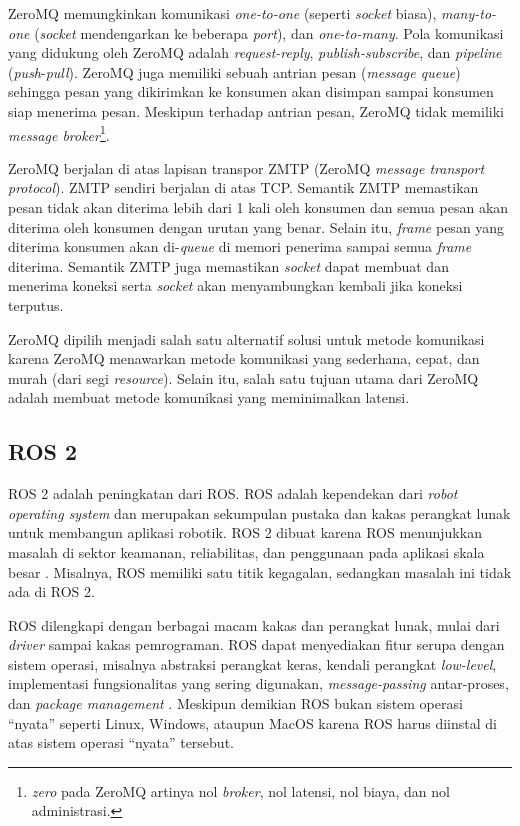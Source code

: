 ZeroMQ memungkinkan komunikasi \textit{one-to-one} (seperti \textit{socket}
biasa), \textit{many-to-one} (\textit{socket} mendengarkan ke beberapa
\textit{port}), dan \textit{one-to-many}. Pola komunikasi yang didukung oleh
ZeroMQ adalah \textit{request-reply}, \textit{publish-subscribe}, dan
\textit{pipeline} (\textit{push}-\textit{pull}). ZeroMQ juga memiliki sebuah
antrian pesan (\textit{message queue}) sehingga pesan yang dikirimkan ke
konsumen akan disimpan sampai konsumen siap menerima pesan. Meskipun terhadap
antrian pesan, ZeroMQ tidak memiliki \textit{message
	broker}\footnote{\textit{zero} pada ZeroMQ artinya nol \textit{broker}, nol
	latensi, nol biaya, dan nol administrasi.}.

ZeroMQ berjalan di atas lapisan transpor ZMTP (ZeroMQ \textit{message transport
	protocol}). ZMTP sendiri berjalan di atas TCP. Semantik ZMTP memastikan
pesan tidak akan diterima lebih dari 1 kali oleh konsumen dan semua pesan
akan diterima oleh konsumen dengan urutan yang benar. Selain itu,
\textit{frame} pesan yang diterima konsumen akan di-\textit{queue} di memori
penerima sampai semua \textit{frame} diterima. Semantik ZMTP juga memastikan
\textit{socket} dapat membuat dan menerima koneksi serta \textit{socket}
akan menyambungkan kembali jika koneksi terputus.

ZeroMQ dipilih menjadi salah satu alternatif solusi untuk metode komunikasi
karena ZeroMQ menawarkan metode komunikasi yang sederhana, cepat, dan murah
(dari segi \textit{resource}). Selain itu, salah satu tujuan utama dari ZeroMQ
adalah membuat metode komunikasi yang meminimalkan latensi.

\subsection{ROS 2}\label{chapter-2-section-ros2}

ROS 2 adalah peningkatan dari ROS. ROS adalah kependekan dari \textit{robot
	operating system} dan merupakan sekumpulan pustaka dan kakas perangkat lunak
untuk membangun aplikasi robotik. ROS 2 dibuat karena ROS menunjukkan masalah di
sektor keamanan, reliabilitas, dan penggunaan pada aplikasi skala besar
\parencite{doi:10.1126/scirobotics.abm6074_ros}. Misalnya, ROS memiliki satu
titik kegagalan, sedangkan masalah ini tidak ada di ROS 2.

ROS dilengkapi dengan berbagai macam kakas dan perangkat lunak, mulai dari
\textit{driver} sampai kakas pemrograman. ROS dapat menyediakan fitur serupa
dengan sistem operasi, misalnya abstraksi perangkat keras, kendali perangkat
\textit{low-level}, implementasi fungsionalitas yang sering digunakan,
\textit{message-passing} antar-proses, dan \textit{package management}
\parencite{x_rosIntro}.  Meskipun demikian ROS bukan sistem operasi ``nyata''
seperti Linux, Windows, ataupun MacOS karena ROS harus diinstal di atas sistem
operasi ``nyata'' tersebut.

